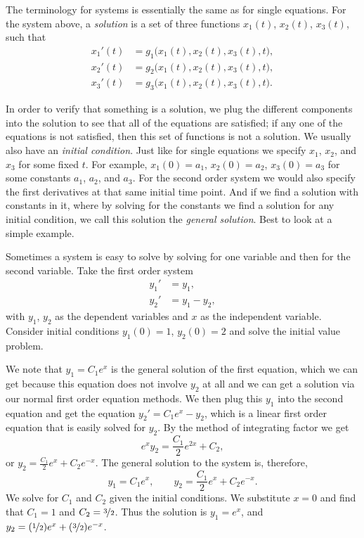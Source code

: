 The terminology for systems is essentially the same as for
single equations.
For the system above, a
\emph{solution}
is a set of three functions $x_1(t)$, $x_2(t)$, $x_3(t)$, such that
\begin{align*}
x_1'(t) &= g_1\bigl(x_1(t),x_2(t),x_3(t),t\bigr) , \\
x_2'(t) &= g_2\bigl(x_1(t),x_2(t),x_3(t),t\bigr) , \\
x_3'(t) &= g_3\bigl(x_1(t),x_2(t),x_3(t),t\bigr) .
\end{align*}

In order to verify that something is a solution, we plug the different components
into the solution to see that all of the equations are satisfied; if any one of the equations
is not satisfied, then this set of functions is not a solution.
We usually also have an
\emph{initial condition}.  Just like
for single equations we specify $x_1$, $x_2$, and $x_3$ for some fixed $t$.
For example, $x_1(0) = a_1$, $x_2(0) = a_2$, $x_3(0) = a_3$
for some constants $a_1$, $a_2$, and $a_3$.  For the second order system
we would also specify the first derivatives at that same initial time point.
And if we find a solution with constants in it, where by solving for the
constants we find a solution for any initial condition, we call this
solution the \emph{general solution}.
Best to look at a simple example.

\begin{example}
Sometimes a system is easy to solve
by solving for one variable and then for the second variable.
Take 
the first order system
\begin{align*}
y_1' & = y_1 , \\
y_2' & = y_1 - y_2 ,
\end{align*}
with $y_1$, $y_2$ as the dependent variables and $x$ as the independent
variable.  Consider initial conditions
$y_1(0) = 1$, $y_2(0) = 2$ and solve the initial value problem.
\end{example}

\begin{exampleSol}
We note that $y_1 = C_1 e^x$ is the general solution of the first equation, which we can get because this equation does not involve $y_2$ at all and we can get a solution via our normal first order equation methods.
We then plug this $y_1$ into the second equation
and get the equation $y_2' = C_1e^x - y_2$, which is a linear first order
equation that is easily solved for $y_2$.  By the method of integrating
factor we get
\begin{equation*}
e^x y_2 = \frac{C_1}{2}e^{2x} + C_2 ,
\end{equation*}
or $y_2 = \frac{C_1}{2}e^{x} + C_2e^{-x}$.  The general solution to the system
is, therefore,
\begin{equation*}
y_1 = C_1 e^x , \qquad
y_2 = \frac{C_1}{2}e^{x} + C_2e^{-x} .
\end{equation*}
We solve for $C_1$ and $C_2$ given the initial conditions.
We substitute $x=0$ and find
that $C_1=1$ and $C_2=\nicefrac{3}{2}$.  Thus the solution is
$y_1 = e^x$, and
$y_2 = (\nicefrac{1}{2}) e^x + (\nicefrac{3}{2}) e^{-x}$.
\end{exampleSol}


